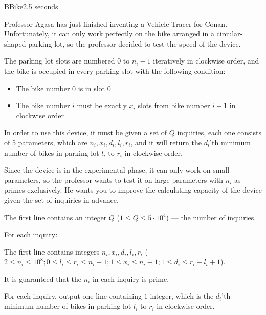 \begin{problem}{B}{Bike}{2.5 seconds}

\noindent
Professor Agasa has just finished inventing a Vehicle Tracer for Conan. Unfortunately, it can only work perfectly on the bike arranged in a circular-shaped parking lot, so the professor decided to test the speed of the device.

\noindent
The parking lot slots are numbered $0$ to $n_i-1$ iteratively in clockwise order, and the bike is occupied in every parking slot with the following condition:

\begin{itemize}

    \item The bike number $0$ is in slot $0$

    \item The bike number $i$ must be exactly $x_i$ slots from bike number $i-1$ in clockwise order

\end{itemize}

\noindent
In order to use this device, it must be given a set of $Q$ inquiries, each one consists of 5 parameters, which are $n_i,x_i,d_i,l_i,r_i$, and it will return the $d_i$'th minimum number of bikes in parking lot $l_i$ to $r_i$ in clockwise order.

\noindent
Since the device is in the experimental phase, it can only work on small parameters, so the professor wants to test it on large parameters with $n_i$ as primes exclusively. He wants you to improve the calculating capacity of the device given the set of inquiries in advance.

\InputFile

\noindent
The first line contains an integer $Q$ ($1 \le Q \le 5\cdot 10^4$) --- the number of inquiries.

\noindent
For each inquiry:

\noindent
The first line contains integers $n_i,x_i,d_i,l_i,r_i$ ($2 \le n_i \le 10^8;0 \le l_i \le r_i \le n_i-1;1 \le x_i \le n_i-1;1 \le d_i \le r_i-l_i+1$).

\noindent
It is guaranteed that the $n_i$ in each inquiry is prime.

\OutputFile

\noindent
For each inquiry, output one line containing $1$ integer, which is the $d_i$'th minimum number of bikes in parking lot $l_i$ to $r_i$ in clockwise order.

\Examples

\begin{example}
\end{example}

\pagebreak

\end{problem}